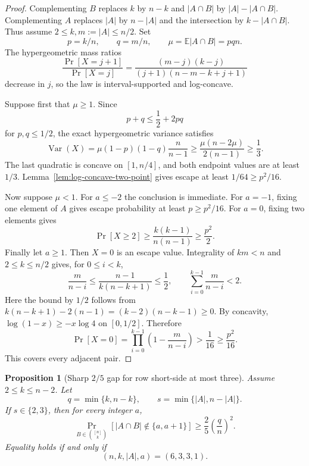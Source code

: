 \documentclass[11pt]{article}
\newtheorem{proposition}[theorem]{Proposition}
\theoremstyle{definition}
\theoremstyle{remark}
\newcommand{\1}{\mathbf 1}
\newcommand{\Var}{\operatorname{Var}}
\begin{document}
\begin{proof}
Complementing $B$ replaces $k$ by $n-k$ and $|A\cap B|$ by
$|A|-|A\cap B|$.  Complementing $A$ replaces $|A|$ by $n-|A|$ and the
intersection by $k-|A\cap B|$.  Thus assume
$2\le k,m:=|A|\le n/2$.  Set
\[
 p=k/n,
 \qquad q=m/n,
 \qquad \mu=\mathbb E|A\cap B|=pqn.
\]
The hypergeometric mass ratios
\[
 \frac{\Pr[X=j+1]}{\Pr[X=j]}
 =\frac{(m-j)(k-j)}{(j+1)(n-m-k+j+1)}
\]
decrease in $j$, so the law is interval-supported and log-concave.

Suppose first that $\mu\ge1$.  Since
\[
 p+q\le\frac12+2pq
\]
for $p,q\le1/2$, the exact hypergeometric variance satisfies
\[
 \Var(X)
 =\mu(1-p)(1-q)\frac n{n-1}
 \ge\frac{\mu(n-2\mu)}{2(n-1)}
 \ge\frac13.
\]
The last quadratic is concave on $[1,n/4]$, and both endpoint values are at
least $1/3$.  Lemma~\ref{lem:log-concave-two-point} gives escape at least
$1/64\ge p^2/16$.

Now suppose $\mu<1$.  For $a\le-2$ the conclusion is immediate.  For
$a=-1$, fixing one element of $A$ gives escape probability at least
$p\ge p^2/16$.  For $a=0$, fixing two elements gives
\[
 \Pr[X\ge2]\ge\frac{k(k-1)}{n(n-1)}\ge\frac{p^2}{2}.
\]
Finally let $a\ge1$.  Then $X=0$ is an escape value.  Integrality of
$km<n$ and $2\le k\le n/2$ gives, for $0\le i<k$,
\[
 \frac m{n-i}
 \le\frac{n-1}{k(n-k+1)}\le\frac12,
 \qquad
 \sum_{i=0}^{k-1}\frac m{n-i}<2.
\]
Here the bound by $1/2$ follows from
$k(n-k+1)-2(n-1)=(k-2)(n-k-1)\ge0$.
By concavity, $\log(1-x)\ge-x\log4$ on $[0,1/2]$.  Therefore
\[
 \Pr[X=0]
 =\prod_{i=0}^{k-1}\left(1-\frac m{n-i}\right)
 >\frac1{16}\ge\frac{p^2}{16}.
\]
This covers every adjacent pair.
\end{proof}

\begin{proposition}[Sharp \(2/5\) gap for row short-side at most three]
\label{prop:sharp-three-marked-gap}
Assume \(2\le k\le n-2\).
Let
\[
 q=\min\{k,n-k\},
 \qquad
 s=\min\{|A|,n-|A|\}.
\]
If \(s\in\{2,3\}\), then for every integer \(a\),
\[
 \Pr_{B\in\binom{[n]}k}[|A\cap B|\notin\{a,a+1\}]
 \ge\frac25\left(\frac qn\right)^2.
\]
Equality holds if and only if
\[
 (n,k,|A|,a)=(6,3,3,1).
\]
\end{proposition}
\end{document}
